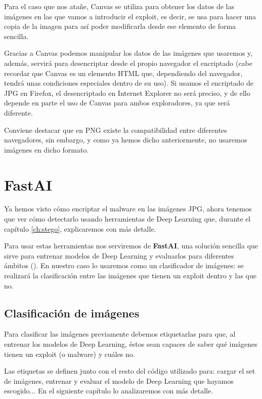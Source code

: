 Para el caso que nos atañe, Canvas se utiliza para obtener los datos de las imágenes en las que vamos a introducir el exploit, es decir, se usa para hacer una copia de la imagen para así poder modificarla desde ese elemento de forma sencilla.

Gracias a Canvas podemos manipular los datos de las imágenes que usaremos y, además, servirá para desencriptar desde el propio navegador el encriptado (cabe recordar que Canvas es un elemento HTML que, dependiendo del navegador, tendrá unas condiciones especiales dentro de su uso). Si usamos el encriptado de JPG en Firefox, el desencriptado en Internet Explorer no será preciso, y de ello depende en parte el uso de Canvas para ambos exploradores, ya que será diferente.

Conviene destacar que en PNG existe la compatibilidad entre diferentes navegadores, sin embargo, y como ya hemos dicho anteriormente, no usaremos imágenes en dicho formato.

\section{FastAI}

Ya hemos visto cómo encriptar el malware en las imágenes JPG, ahora tenemos que ver cómo detectarlo usando herramientas de Deep Learning que, durante el capítulo \ref{ch:stego}, explicaremos con más detalle.

Para usar estas herramientas nos serviremos de \textbf{FastAI}, una solución sencilla que sirve para entrenar modelos de Deep Learning y evaluarlos para diferentes ámbitos (\cite{fastai}). En nuestro caso lo usaremos como un clasificador de imágenes: se realizará la clasificación entre las imágenes que tienen un exploit dentro y las que no. %

\subsection{Clasificación de imágenes}

Para clasificar las imágenes previamente debemos etiquetarlas para que, al entrenar los modelos de Deep Learning, éstos sean capaces de saber qué imágenes tienen un exploit (o malware) y cuáles no.

Las etiquetas se definen junto con el resto del código utilizado para: cargar el set de imágenes, entrenar y evaluar el modelo de Deep Learning que hayamos escogido... En el siguiente capítulo lo analizaremos con más detalle.

